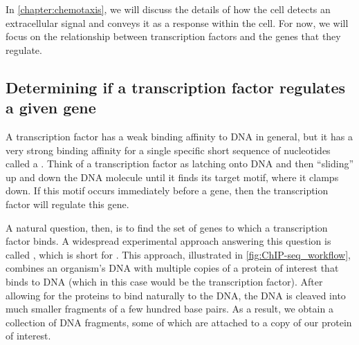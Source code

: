 In \autoref{chapter:chemotaxis}, we will discuss the details of how the cell detects an extracellular signal and conveys it as a response within the cell. For now, we will focus on the relationship between transcription factors and the genes that they regulate.

\subsection{Determining if a transcription factor regulates a given gene}

A transcription factor has a weak binding affinity to DNA in general, but it has a very strong binding affinity for a single specific short sequence of nucleotides called a . Think of a transcription factor as latching onto DNA and then ``sliding'' up and down the DNA molecule until it finds its target motif, where it clamps down. If this motif occurs immediately before a gene, then the transcription factor will regulate this gene.\\

\begin{note}\end{note}

A natural question, then, is to find the set of genes to which a transcription factor binds. A widespread experimental approach answering this question is called , which is short for . This approach, illustrated in \autoref{fig:ChIP-seq_workflow}, combines an organism's DNA with multiple copies of a protein of interest that binds to DNA (which in this case would be the transcription factor). After allowing for the proteins to bind naturally to the DNA, the DNA is cleaved into much smaller fragments of a few hundred base pairs. As a result, we obtain a collection of DNA fragments, some of which are attached to a copy of our protein of interest.

